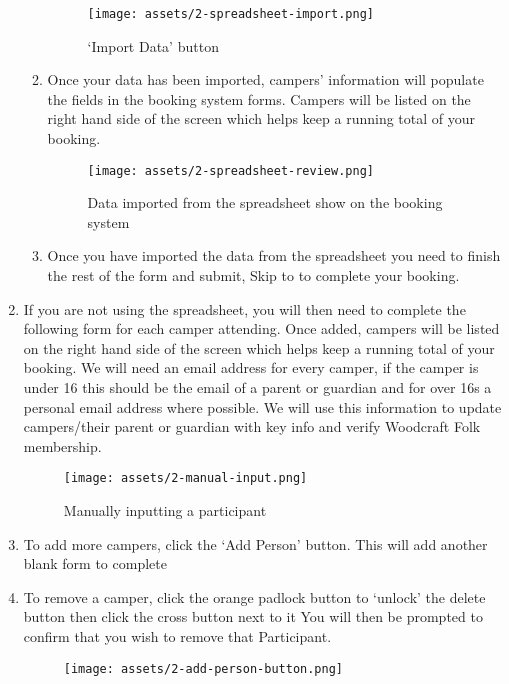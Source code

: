 \documentclass[a4paper, 11pt]{report}
\begin{document}
\begin{enumerate}
\begin{enumerate}
        \begin{figure}[H]
            \centering
            \texttt{[image: assets/2-spreadsheet-import.png]}
            \caption{`Import Data' button}
        \end{figure}
        \item Once your data has been imported, campers' information will populate the fields in the booking system forms. Campers will be listed on the right hand side of the screen which helps keep a running total of your booking.
        \begin{figure}[H]
            \centering
            \texttt{[image: assets/2-spreadsheet-review.png]}
            \caption{Data imported from the spreadsheet show on the booking system}
        \end{figure}
        \item Once you have imported the data from the spreadsheet you need to finish the rest of the form and submit, Skip to  to complete your booking.
    \end{enumerate}
    \item \label{manual-import}  If you are not using the spreadsheet, you will then need to complete the following form for each camper attending. Once added, campers will be listed on the right hand side of the screen which helps keep a running total of your booking. We will need an email address for every camper, if the camper is under 16 this should be the email of a parent or guardian and for over 16s a personal email address where possible. We will use this information to update campers/their parent or guardian with key info and verify Woodcraft Folk membership.
    \begin{figure}[H]
        \centering
        \texttt{[image: assets/2-manual-input.png]}
        \caption{Manually inputting a participant}
    \end{figure}
    \item To add more campers, click the `Add Person' button. This will add another blank form to complete
    \item To remove a camper, click the orange padlock button to `unlock' the delete button then click the cross button next to it You will then be prompted to confirm that you wish to remove that Participant.
    \begin{figure}[H]
        \centering
        \texttt{[image: assets/2-add-person-button.png]}

\end{figure}
\end{enumerate}
\end{document}

